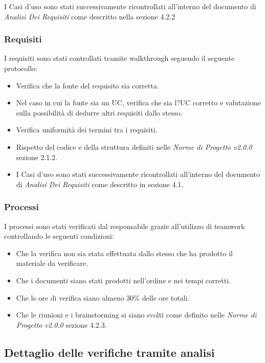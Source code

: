 \documentclass[a4paper]{article}
\begin{document}
				I Casi d'uso sono stati successivamente ricontrollati all'interno del documento di \emph{Analisi Dei Requisiti} come
				descritto nella sezione 4.2.2
			\subsubsection{Requisiti}
				I requisiti sono stati controllati tramite walkthrough seguendo il seguente protocollo:
					\begin{itemize}
						\item Verifica che la fonte del requisito sia corretta.
						\item Nel caso in cui la fonte sia un UC, verifica che sia l?UC corretto e valutazione
	 sulla possibilità di dedurre altri requisiti dallo stesso.
						\item Verifica uniformità dei termini tra i requisiti.
						\item Rispetto del codice e della struttura definiti nelle \emph{Norme di Progetto v2.0.0} sezione 2.1.2.
						\item I Casi d'uso sono stati successivamente ricontrollati all'interno del documento di \emph{Analisi Dei Requisiti} 
						come descritto in sezione 4.1.
					\end{itemize}
			\subsubsection{Processi}
				I processi sono stati verificati dal responsabile grazie all'utilizzo di teamwork controllando le seguenti condizioni:
				\begin{itemize}
					\item Che la verifica non sia stata effettuata dallo stesso che ha prodotto il materiale da verificare.
					\item Che i documenti siano stati prodotti nell'ordine e nei tempi corretti.
					\item Che le ore di verifica siano almeno 30\% delle ore totali.
					\item Che le riunioni e i brainstorming si siano svolti come definito nelle \emph{Norme di Progetto v2.0.0} sezione 4.2.3.
				\end{itemize}
				
		
		\subsection{Dettaglio delle verifiche tramite analisi}
\end{document}

